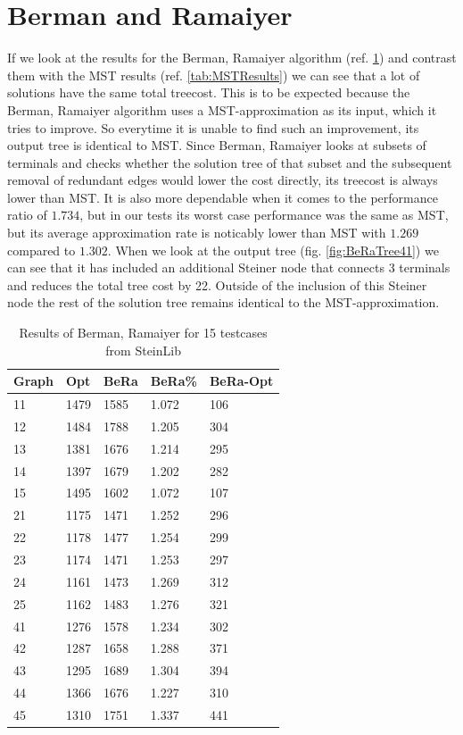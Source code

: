 \section{Berman and Ramaiyer}

If we look at the results for the Berman, Ramaiyer algorithm (ref. \ref{tab:BeRaResults}) and contrast them with the MST results (ref. \ref{tab:MSTResults}) we can see that a lot of solutions have the same total treecost. This is to be expected because the Berman, Ramaiyer algorithm uses a MST-approximation as its input, which it tries to improve. So everytime it is unable to find such an improvement, its output tree is identical to MST. Since Berman, Ramaiyer looks at subsets of terminals and checks whether the solution tree of that subset and the subsequent removal of redundant edges would lower the cost directly, its treecost is always lower than MST. It is also more dependable when it comes to the performance ratio of $1.734$, but in our tests its worst case performance was the same as MST, but its average approximation rate is noticably lower than MST with $1.269$ compared to $1.302$. When we look at the output tree (fig. \ref{fig:BeRaTree41}) we can see that it has included an additional Steiner node that connects 3 terminals and reduces the total tree cost by 22. Outside of the inclusion of this Steiner node the rest of the solution tree remains identical to the MST-approximation. 
\begin{table}[htbp]
 \caption{Results of Berman, Ramaiyer for 15 testcases from SteinLib \cite{Dui93}}\label{tab:BeRaResults} 	
 \centering
 \begin{tabular}{l l l l l}
\toprule
Graph & Opt & BeRa & BeRa\% & BeRa-Opt \\
\midrule
11	& 1479	& 1585	& 1.072	& 106 \\
12	& 1484	& 1788	& 1.205	& 304 \\
13	& 1381	& 1676	& 1.214	& 295 \\
14	& 1397	& 1679	& 1.202	& 282 \\
15	& 1495	& 1602	& 1.072	& 107 \\
\midrule 
21	& 1175	& 1471	& 1.252	& 296 \\
22	& 1178	& 1477	& 1.254	& 299 \\
23	& 1174	& 1471	& 1.253	& 297 \\
24	& 1161	& 1473	& 1.269 	& 312 \\
25	& 1162	& 1483	& 1.276	& 321 \\
\midrule
41	& 1276	& 1578	& 1.234	& 302 \\
42	& 1287	& 1658	& 1.288	& 371 \\
43	& 1295	& 1689	& 1.304	& 394 \\
44	& 1366	& 1676	& 1.227	& 310 \\
45	& 1310	& 1751	& 1.337	& 441 \\
\bottomrule
\end{tabular}
\end{table}

